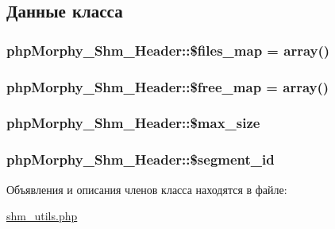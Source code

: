 \subsection{Данные класса}
\hypertarget{classphpMorphy__Shm__Header_a1a7aa025c22d1f96081282413c3e2eb9}{
\subsubsection[{\$files\_\-map}]{\setlength{\rightskip}{0pt plus 5cm}phpMorphy\_\-Shm\_\-Header::\$files\_\-map = array()}}
\label{classphpMorphy__Shm__Header_a1a7aa025c22d1f96081282413c3e2eb9}
\hypertarget{classphpMorphy__Shm__Header_a5b32cd9c7206a4ea6016485b98ea70f3}{
\subsubsection[{\$free\_\-map}]{\setlength{\rightskip}{0pt plus 5cm}phpMorphy\_\-Shm\_\-Header::\$free\_\-map = array()}}
\label{classphpMorphy__Shm__Header_a5b32cd9c7206a4ea6016485b98ea70f3}
\hypertarget{classphpMorphy__Shm__Header_afa4cfa3077807fb09b107f89f7bda0b1}{
\subsubsection[{\$max\_\-size}]{\setlength{\rightskip}{0pt plus 5cm}phpMorphy\_\-Shm\_\-Header::\$max\_\-size}}
\label{classphpMorphy__Shm__Header_afa4cfa3077807fb09b107f89f7bda0b1}
\hypertarget{classphpMorphy__Shm__Header_a94145c62fe50387c3140d6240bdfd83f}{
\subsubsection[{\$segment\_\-id}]{\setlength{\rightskip}{0pt plus 5cm}phpMorphy\_\-Shm\_\-Header::\$segment\_\-id}}
\label{classphpMorphy__Shm__Header_a94145c62fe50387c3140d6240bdfd83f}


Объявления и описания членов класса находятся в файле:\begin{DoxyCompactItemize}
\item 
\hyperlink{shm__utils_8php}{shm\_\-utils.php}\end{DoxyCompactItemize}
